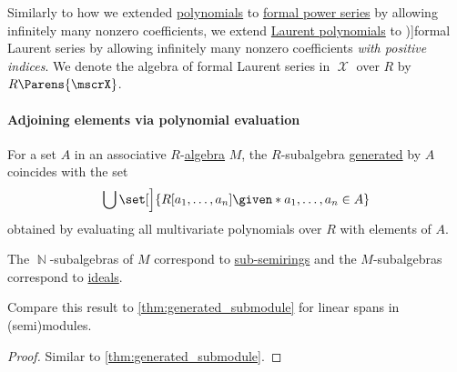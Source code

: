 \begin{definition}\label{def:formal_laurent_series}
  Similarly to how we extended \hyperref[def:polynomial_algebra/polynomials]{polynomials} to \hyperref[def:formal_power_series]{formal power series} by allowing infinitely many nonzero coefficients, we extend \hyperref[def:laurent_polynomial_algebra]{Laurent polynomials} to \term[ru=формальные ряды Лорана (\cite[23]{Шафаревич2019ОсновныеПонятияАлгебры})]{formal Laurent series} by allowing infinitely many nonzero coefficients \emph{with positive indices}. We denote the algebra of formal Laurent series in \( \mscrX \) over \( R \) by \( R\Parens{\mscrX} \).
\end{definition}

\paragraph{Adjoining elements via polynomial evaluation}

\begin{proposition}\label{thm:generators_via_polynomials}
  For a set \( A \) in an associative \( R \)-\hyperref[def:algebra_over_semiring]{algebra} \( M \), the \( R \)-subalgebra \hyperref[def:algebra_over_semiring/generated]{generated} by \( A \) coincides with the set
  \begin{equation*}
    \bigcup \set[\Big]{ R[a_1, \ldots, a_n] \given* a_1, \ldots, a_n \in A }
  \end{equation*}
  obtained by evaluating all multivariate polynomials over \( R \) with elements of \( A \).
\end{proposition}
\begin{comments}
  \item The \( \BbbN \)-subalgebras of \( M \) correspond to \hyperref[def:semiring/subobject]{sub-semirings} and the \( M \)-subalgebras correspond to \hyperref[def:semiring_ideal]{ideals}.

  \item Compare this result to \cref{thm:generated_submodule} for linear spans in (semi)modules.
\end{comments}
\begin{proof}
  Similar to \cref{thm:generated_submodule}.
\end{proof}

